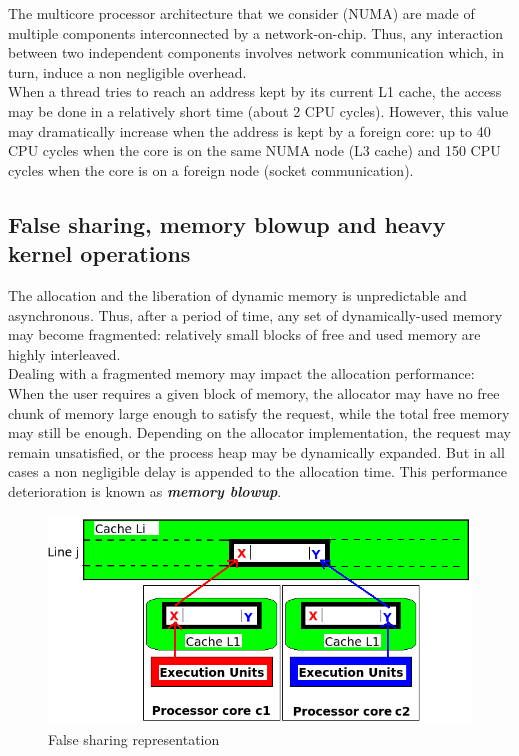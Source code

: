 \documentclass[10pt]{article}											%
\begin{document}
The multicore processor architecture that we consider (NUMA) are made of multiple components interconnected by a network-on-chip.   Thus, any interaction between two independent components involves network communication which, in turn, induce a non negligible overhead.\\
When a thread tries to reach an address kept by its current L1 cache, the access may be done in a relatively short time (about 2 CPU cycles).   However, this value may dramatically increase when the address is kept by a foreign core:  up to 40 CPU cycles when the core is on the same NUMA node (L3 cache) and 150 CPU cycles when the core is on a foreign node (socket communication).



\subsection{False sharing, memory blowup and heavy kernel operations}
The allocation and the liberation of dynamic memory is unpredictable and asynchronous\cite{cacheCoherence_sorin}.   Thus, after a period of time, any set of dynamically-used memory may become fragmented:   relatively small blocks of free and used memory are highly interleaved.\\
Dealing with a fragmented memory may impact the allocation performance:   When the user requires a given block of memory, the allocator may have no free chunk of memory large enough to satisfy the request, while the total free memory may still be enough.   Depending on the allocator implementation, the request may remain unsatisfied, or the process heap may be dynamically expanded.   But in all cases a non negligible delay is appended to the allocation time.   This performance deterioration is known as \textbf{\textit{memory blowup}}.\\

	\begin{figure}
				\includegraphics[width=1.0\linewidth]{charts/falseSharing.png}
		\caption{False sharing representation}
		\label{falseSharing.png}
	\end{figure}
\end{document}

